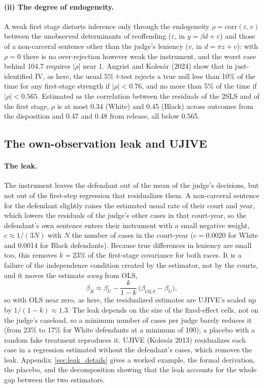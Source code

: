 \documentclass[11pt]{article}
\begin{document}
\paragraph{(ii) The degree of endogeneity.} A weak first stage distorts inference only through the endogeneity $\rho = \mathrm{corr}(\varepsilon, v)$ between the unobserved determinants of reoffending ($\varepsilon$, in $y = \beta d + \varepsilon$) and those of a non-carceral sentence other than the judge's leniency ($v$, in $d = \pi z + v$): with $\rho = 0$ there is no over-rejection however weak the instrument, and the worst case behind 104.7 requires $|\rho|$ near 1. Angrist and Kolesár (2024) show that in just-identified IV, as here, the usual 5\% $t$-test rejects a true null less than 10\% of the time for any first-stage strength if $|\rho| < 0.76$, and no more than 5\% of the time if $|\rho| < 0.565$. Estimated as the correlation between the residuals of the 2SLS and of the first stage, $\rho$ is at most 0.34 (White) and 0.45 (Black) across outcomes from the disposition and 0.47 and 0.48 from release, all below 0.565.

\subsection{The own-observation leak and UJIVE}\label{sec:ujive}

\paragraph{The leak.} The instrument leaves the defendant out of the mean of the judge's decisions, but not out of the first-step regression that residualizes them. A non-carceral sentence for the defendant slightly raises the estimated usual rate of their court and year, which lowers the residuals of the judge's other cases in that court-year, so the defendant's own sentence enters their instrument with a small negative weight, $c \approx 1/(3N)$ with $N$ the number of cases in the court-year ($c = 0.0020$ for White and 0.0014 for Black defendants). Because true differences in leniency are small too, this removes $k = 23\%$ of the first-stage covariance for both races. It is a failure of the independence condition created by the estimator, not by the courts, and it moves the estimate \emph{away} from OLS,
\begin{equation*}
\beta_R \approx \beta_U - \frac{k}{1-k}\,\bigl(\beta_{OLS} - \beta_U\bigr),
\end{equation*}
so with OLS near zero, as here, the residualized estimates are UJIVE's scaled up by $1/(1-k) \approx 1.3$. The leak depends on the size of the fixed-effect cells, not on the judge's caseload, so a minimum number of cases per judge barely reduces it (from 23\% to 17\% for White defendants at a minimum of 100); a placebo with a random fake treatment reproduces it. UJIVE (Kolesár 2013) residualizes each case in a regression estimated without the defendant's cases, which removes the leak. Appendix~\ref{sec:leak_details} gives a worked example, the formal derivation, the placebo, and the decomposition showing that the leak accounts for the whole gap between the two estimators.
\end{document}

